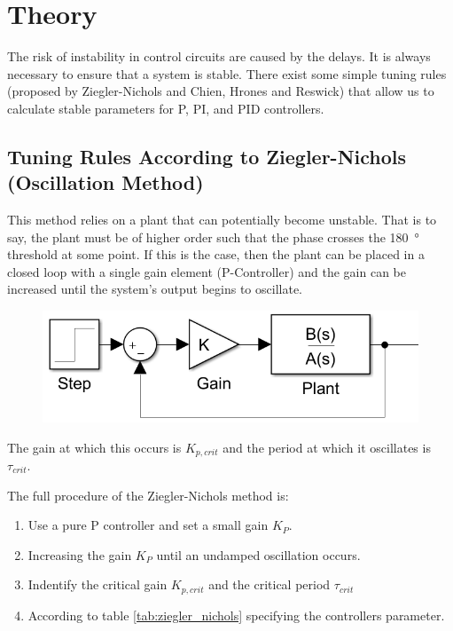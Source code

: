 \section{Theory}

The  risk  of  instability in control circuits are caused by the delays. It is
always  necessary to ensure that a system is stable. There exist  some  simple
tuning rules (proposed by Ziegler-Nichols and Chien, Hrones and Reswick)  that
allow us to calculate stable  parameters  for  P,  PI,  and  PID  controllers.


\subsection{Tuning Rules According to Ziegler-Nichols (Oscillation Method)}

This method relies on a plant that can potentially become unstable. That is to
say,  the  plant  must be of higher order such  that  the  phase  crosses  the
\SI{180}{\degree} threshold at some point. If this is the case, then the plant
can be  placed  in a closed loop with a single gain element (P-Controller) and
the gain can be  increased  until  the  system's  output  begins to oscillate.

\begin{figure}[H]
    \centering
    \includegraphics[width=\imagewidth]{images/osc_method.png}
\end{figure}

The gain at which this occurs  is  $K_{p,crit}$  and  the  period  at which it
oscillates is $\tau_{crit}$.

The full procedure of the Ziegler-Nichols method is:

\begin{enumerate}
    \item Use a pure P controller and set a small gain $K_{P}$.
    \item Increasing the gain $K_{P}$ until an undamped oscillation occurs.
    \item Indentify the critical gain $K_{p,crit}$ and the critical period $\tau_{crit}$
    \item According to table \ref{tab:ziegler_nichols} specifying the controllers parameter.
\end{enumerate}

